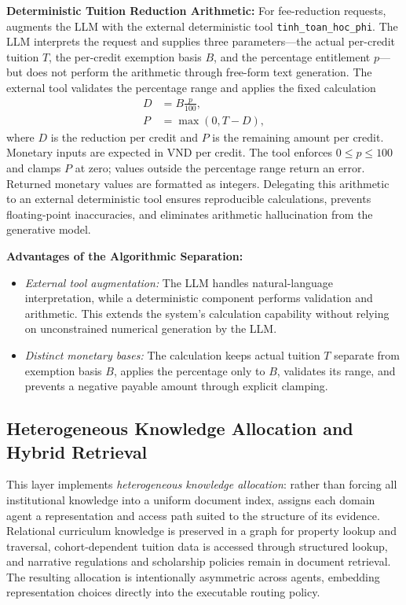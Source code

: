 \textbf{Deterministic Tuition Reduction Arithmetic:}
For fee-reduction requests, \system{} augments the LLM with the external deterministic tool \texttt{tinh\_toan\_hoc\_phi}. The LLM interprets the request and supplies three parameters---the actual per-credit tuition $T$, the per-credit exemption basis $B$, and the percentage entitlement $p$---but does not perform the arithmetic through free-form text generation. The external tool validates the percentage range and applies the fixed calculation
\begin{align}
  D &= B\frac{p}{100}, \label{eq:reduction} \\
  P &= \max(0, T-D), \label{eq:payable}
\end{align}
where $D$ is the reduction per credit and $P$ is the remaining amount per credit. Monetary inputs are expected in VND per credit. The tool enforces $0 \le p \le 100$ and clamps $P$ at zero; values outside the percentage range return an error. Returned monetary values are formatted as integers. Delegating this arithmetic to an external deterministic tool ensures reproducible calculations, prevents floating-point inaccuracies, and eliminates arithmetic hallucination from the generative model.

\textbf{Advantages of the Algorithmic Separation:}
\begin{itemize}
    \item \emph{External tool augmentation:} The LLM handles natural-language interpretation, while a deterministic component performs validation and arithmetic. This extends the system's calculation capability without relying on unconstrained numerical generation by the LLM.
    \item \emph{Distinct monetary bases:} The calculation keeps actual tuition $T$ separate from exemption basis $B$, applies the percentage only to $B$, validates its range, and prevents a negative payable amount through explicit clamping.
\end{itemize}

\subsection{Heterogeneous Knowledge Allocation and Hybrid Retrieval}
\label{sec:hybrid_retrieval}

This layer implements \emph{heterogeneous knowledge allocation}: rather than forcing all institutional knowledge into a uniform document index, \system{} assigns each domain agent a representation and access path suited to the structure of its evidence. Relational curriculum knowledge is preserved in a graph for property lookup and traversal, cohort-dependent tuition data is accessed through structured lookup, and narrative regulations and scholarship policies remain in document retrieval. The resulting allocation is intentionally asymmetric across agents, embedding representation choices directly into the executable routing policy.

